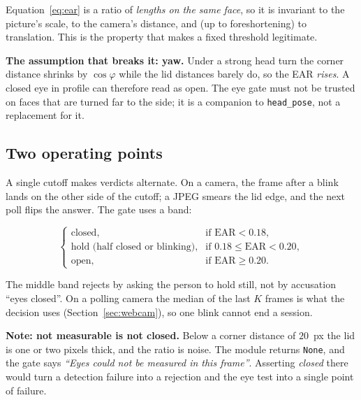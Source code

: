 \documentclass[11pt,a4paper]{article}
\newcommand{\coden}[1]{\texttt{\small #1}}
\begin{document}
Equation~\eqref{eq:ear} is a ratio of \emph{lengths on the same face},
so it is invariant to the picture's scale, to the camera's distance, and
(up to foreshortening) to translation. This is the property that makes
a fixed threshold legitimate.

\begin{warnbox}
\textbf{The assumption that breaks it: yaw.} Under a strong head turn
the corner distance shrinks by $\cos\varphi$ while the lid distances
barely do, so the EAR \emph{rises}. A closed eye in profile can therefore
read as open. The eye gate must not be trusted on faces that are turned
far to the side; it is a companion to \coden{head\_pose}, not a
replacement for it.
\end{warnbox}

\subsection{Two operating points}

A single cutoff makes verdicts alternate. On a camera, the frame after
a blink lands on the other side of the cutoff; a JPEG smears the lid
edge, and the next poll flips the answer. The gate uses a band:

\begin{equation}
  \begin{cases}
    \text{closed}, & \text{if } \mathrm{EAR} < 0.18,\\[2pt]
    \text{hold (half closed or blinking)}, & \text{if } 0.18 \le \mathrm{EAR} < 0.20,\\[2pt]
    \text{open}, & \text{if } \mathrm{EAR} \ge 0.20.
  \end{cases}
\end{equation}

The middle band rejects by asking the person to hold still, not by
accusation ``eyes closed''. On a polling camera the median of the last
$K$ frames is what the decision uses (Section~\ref{sec:webcam}), so one
blink cannot end a session.

\begin{keybox}\textbf{Note: not measurable is not closed.}
  Below a corner distance of $20$~px the lid is one or two pixels thick,
  and the ratio is noise. The module returns \texttt{None}, and the gate
  says \emph{``Eyes could not be measured in this frame''}. Asserting
  \emph{closed} there would turn a detection failure into a rejection
  and the eye test into a single point of failure.
\end{keybox}
\end{document}
